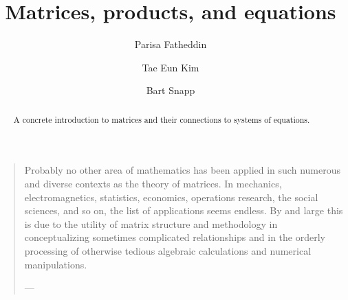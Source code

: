\documentclass{ximera}
\author{Parisa Fatheddin \and Tae Eun Kim \and Bart Snapp}
\title{Matrices, products, and equations}
\begin{document}
\begin{abstract}
  A concrete introduction to matrices and their connections to systems
  of equations.
\end{abstract}
\maketitle

\begin{quote}
  Probably no other area of mathematics has been applied in such
  numerous and diverse contexts as the theory of matrices. In
  mechanics, electromagnetics, statistics, economics, operations
  research, the social sciences, and so on, the list of applications
  seems endless. By and large this is due to the utility of matrix
  structure and methodology in conceptualizing sometimes complicated
  relationships and in the orderly processing of otherwise tedious
  algebraic calculations and numerical manipulations.



  \hfill ---
\end{quote}
\end{document}
